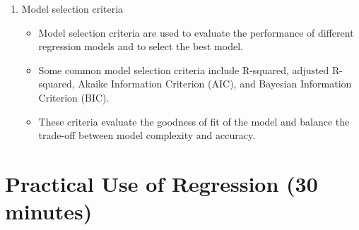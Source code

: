 \documentclass{article}
\begin{document}
\begin{enumerate}[label=\alph*)]
\item Model selection criteria
\begin{itemize}
\item Model selection criteria are used to evaluate the performance of different regression models and to select the best model.
\item Some common model selection criteria include R-squared, adjusted R-squared, Akaike Information Criterion (AIC), and Bayesian Information Criterion (BIC).
\item These criteria evaluate the goodness of fit of the model and balance the trade-off between model complexity and accuracy.
\end{itemize}
\end{enumerate}

\section{Practical Use of Regression (30 minutes)}
\end{document}
